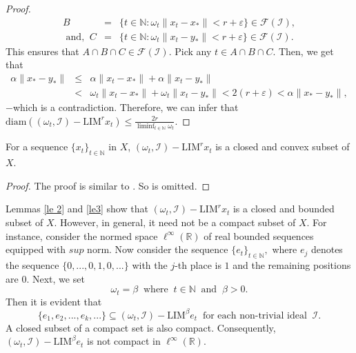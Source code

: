 \documentclass[reqno]{amsart}
\begin{document}
{\begin{proof}
\begin{eqnarray*}
	B&=&\{t\in\mathbb{N}:\omega_t\|x_t-x_*\|<r+\varepsilon\}\in \mathcal{F}(\mathcal{I}),\\
		\mbox{  and,  }~
	C&=&\{t\in\mathbb{N}:\omega_t\|x_t-y_*\|<r+\varepsilon\}\in \mathcal{F}(\mathcal{I}).
	\end{eqnarray*}
This ensures that $A\cap B\cap C\in \mathcal{F}(\mathcal{I})$. Pick any $t\in A\cap B\cap C$. Then, we get that 
\begin{eqnarray*}
\alpha\|x_*-y_*\|&\leq &\alpha\|x_t-x_*\|+\alpha\|x_t-y_*\|\\
&<&\omega_t\|x_t-x_*\|+\omega_t\|x_t-y_*\|<2(r+\varepsilon)<\alpha\|x_*-y_*\|,
\end{eqnarray*}
$-$which is a contradiction. Therefore, we can infer that
$\mbox{diam}((\omega_t,\mathcal{I})-\text{LIM}^r x_t)\leq \frac{2r}{\displaystyle\liminf_{t\in\mathbb{N}}\omega_t}.$
\end{proof}
\begin{lemma}\label{le3}
For a sequence $\{x_t\}_{t\in\mathbb{N}}$ in $X$, $(\omega_t,\mathcal{I})-\text{LIM}^r x_t$ is a closed and convex subset of $X$.
\end{lemma}
\begin{proof}
The proof is similar to \cite[Theorems 3.3 and 3.4]{das2018characterization}. So is omitted.
\end{proof}
\begin{note}\label{note 2.2}
Lemmas \ref{le 2} and \ref{le3} show that $(\omega_t,\mathcal{I})-\text{LIM}^r x_t$ is a closed and bounded subset of $X$. However, in general, it need not be a compact subset of $X$. For instance, consider the normed space $\ell^\infty(\mathbb{R})$ of real bounded sequences equipped with $sup$ norm. 
Now consider the sequence $\{e_t\}_{t\in\mathbb{N}},$ where $e_j$ denotes the sequence $\{0,...,0,1,0,...\}$ with the $j$-th place is $1$ and the remaining positions are $0.$
Next, we set
\begin{equation*}
	\omega_t=\beta~\mbox{ where }~t\in\mathbb{N}~\mbox{ and }~\beta>0.
\end{equation*}
  Then it is evident that
$$
\{e_1,e_2,...,e_k,...\}\subseteq (\omega_t,\mathcal{I})-\text{LIM}^{\beta} e_t~\mbox{ for each non-trivial ideal }~\mathcal{I}.
$$
A closed subset of a compact set is also compact. Consequently, $(\omega_t,\mathcal{I})-\text{LIM}^{\beta} e_t
$ is not compact in $\ell^\infty(\mathbb{R}).$
\end{note}


}
\end{document}

